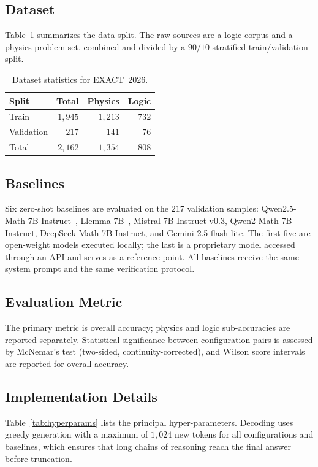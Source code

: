 \documentclass[preprint,12pt]{elsarticle}
\newcommand{\dataset}{EXACT~2026}
\begin{document}
\subsection{Dataset}
Table~\ref{tab:dataset} summarizes the data split. The raw sources are a
logic corpus and a physics problem set, combined and divided by a $90/10$
stratified train/validation split.

\begin{table}[t]
\centering
\caption{Dataset statistics for \dataset{}.}
\label{tab:dataset}
\begin{tabular}{lrrr}
\toprule
Split & Total & Physics & Logic \\
\midrule
Train & $1{,}945$ & $1{,}213$ & $732$ \\
Validation & $217$ & $141$ & $76$ \\
\midrule
Total & $2{,}162$ & $1{,}354$ & $808$ \\
\bottomrule
\end{tabular}
\end{table}

\subsection{Baselines}
Six zero-shot baselines are evaluated on the $217$ validation samples:
Qwen2.5-Math-7B-Instruct~\cite{Yang2024}, Llemma-7B~\cite{Azerbayev2024},
Mistral-7B-Instruct-v0.3, Qwen2-Math-7B-Instruct, DeepSeek-Math-7B-Instruct,
and Gemini-2.5-flash-lite. The first five are open-weight models executed
locally; the last is a proprietary model accessed through an API and serves
as a reference point. All baselines receive the same system prompt and the
same verification protocol.

\subsection{Evaluation Metric}
The primary metric is overall accuracy; physics and logic sub-accuracies are
reported separately. Statistical significance between configuration pairs is
assessed by McNemar's test (two-sided, continuity-corrected), and Wilson
score intervals are reported for overall accuracy.

\subsection{Implementation Details}
Table~\ref{tab:hyperparams} lists the principal hyper-parameters. Decoding
uses greedy generation with a maximum of $1{,}024$ new tokens for all
configurations and baselines, which ensures that long chains of reasoning
reach the final answer before truncation.
\end{document}
